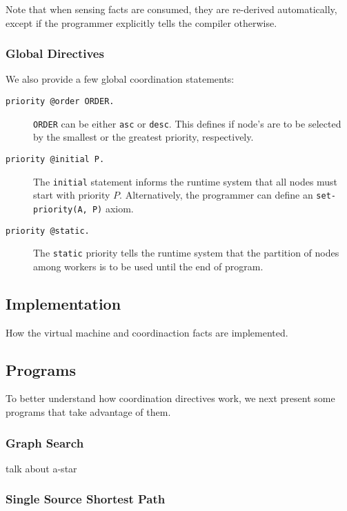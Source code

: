 Note that when sensing facts are consumed, they are re-derived automatically, except if the programmer explicitly tells the compiler otherwise. 

\subsubsection{Global Directives}

We also provide a few global coordination statements:

\begin{description}
   \item[\texttt{priority @order ORDER.}] \texttt{ORDER} can be either \texttt{asc} or \texttt{desc}. This defines if node's are to be selected by the smallest or the greatest priority, respectively.
   \item[\texttt{priority @initial P.}] The \texttt{initial} statement informs the runtime system that all nodes must start with priority $P$. Alternatively, the programmer can define an \texttt{set-priority(A, P)} axiom.
   \item[\texttt{priority @static.}] The \texttt{static} priority tells the runtime system that the partition of nodes among workers is to be used until the end of program. 
\end{description}

\subsection{Implementation}

How the virtual machine and coordinaction facts are implemented.

\subsection{Programs}

To better understand how coordination directives work, we next present some programs that
take advantage of them.

\subsubsection{Graph Search}

talk about a-star

\subsubsection{Single Source Shortest Path}

